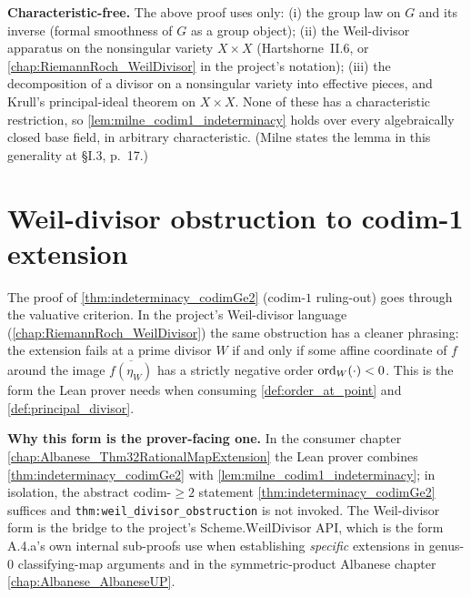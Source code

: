 \begin{remark}
  \label{rmk:milne_lem33_charfree}
  \textbf{Characteristic-free.} The above proof uses only: (i) the group law on \(G\)
  and its inverse (formal smoothness of \(G\) as a group object); (ii) the Weil-divisor
  apparatus on the nonsingular variety \(X \times X\) (Hartshorne~II.6, or
  \cref{chap:RiemannRoch_WeilDivisor} in the project's notation); (iii) the
  decomposition of a divisor on a nonsingular variety into effective pieces, and
  Krull's principal-ideal theorem on \(X \times X\). None of these has a characteristic
  restriction, so \cref{lem:milne_codim1_indeterminacy} holds over every
  algebraically closed base field, in arbitrary characteristic. (Milne states the
  lemma in this generality at \S I.3, p.~17.)
\end{remark}

\section{Weil-divisor obstruction to codim-1 extension}
\label{sec:weil_obstruction}

The proof of \cref{thm:indeterminacy_codimGe2} (codim-\(1\) ruling-out) goes
through the valuative criterion. In the project's Weil-divisor language
(\cref{chap:RiemannRoch_WeilDivisor}) the same obstruction has a cleaner phrasing:
the extension fails at a prime divisor \(W\) if and only if some affine coordinate of
\(f\) around the image \(\overline{f(\eta_W)}\) has a strictly negative order
\(\operatorname{ord}_W(\cdot) < 0\). This is the form the Lean prover needs when consuming
\cref{def:order_at_point} and \cref{def:principal_divisor}.


\begin{remark}
  \label{rmk:weil_obstruction_application}
  \textbf{Why this form is the prover-facing one.} In the consumer chapter
  \cref{chap:Albanese_Thm32RationalMapExtension} the Lean prover combines
  \cref{thm:indeterminacy_codimGe2} with \cref{lem:milne_codim1_indeterminacy}; in
  isolation, the abstract codim-\(\geq 2\) statement
  \cref{thm:indeterminacy_codimGe2} suffices and \texttt{thm:weil_divisor_obstruction}
  is not invoked. The Weil-divisor form is the bridge to the project's
  \(\mathrm{Scheme.WeilDivisor}\) API, which is the form A.4.a's own internal sub-proofs
  use when establishing \emph{specific} extensions in genus-\(0\) classifying-map
  arguments and in the symmetric-product Albanese chapter
  \cref{chap:Albanese_AlbaneseUP}.
\end{remark}


